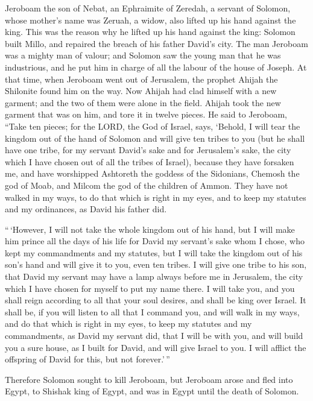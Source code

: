  Jeroboam the son of Nebat, an Ephraimite of Zeredah, a
servant of Solomon, whose mother's name was Zeruah, a widow, also lifted
up his hand against the king.  This was the reason why he
lifted up his hand against the king: Solomon built Millo, and repaired
the breach of his father David's city.  The man Jeroboam
was a mighty man of valour; and Solomon saw the young man that he was
industrious, and he put him in charge of all the labour of the house of
Joseph.  At that time, when Jeroboam went out of Jerusalem,
the prophet Ahijah the Shilonite found him on the way. Now Ahijah had
clad himself with a new garment; and the two of them were alone in the
field.  Ahijah took the new garment that was on him, and
tore it in twelve pieces.  He said to Jeroboam, ``Take ten
pieces; for the LORD, the God of Israel, says, `Behold, I will tear the
kingdom out of the hand of Solomon and will give ten tribes to you
 (but he shall have one tribe, for my servant David's sake
and for Jerusalem's sake, the city which I have chosen out of all the
tribes of Israel),  because they have forsaken me, and have
worshipped Ashtoreth the goddess of the Sidonians, Chemosh the god of
Moab, and Milcom the god of the children of Ammon. They have not walked
in my ways, to do that which is right in my eyes, and to keep my
statutes and my ordinances, as David his father did.

 ``\,`However, I will not take the whole kingdom out of his
hand, but I will make him prince all the days of his life for David my
servant's sake whom I chose, who kept my commandments and my statutes,
 but I will take the kingdom out of his son's hand and will
give it to you, even ten tribes.  I will give one tribe to
his son, that David my servant may have a lamp always before me in
Jerusalem, the city which I have chosen for myself to put my name there.
 I will take you, and you shall reign according to all that
your soul desires, and shall be king over Israel.  It shall
be, if you will listen to all that I command you, and will walk in my
ways, and do that which is right in my eyes, to keep my statutes and my
commandments, as David my servant did, that I will be with you, and will
build you a sure house, as I built for David, and will give Israel to
you.  I will afflict the offspring of David for this, but
not forever.'\,''

 Therefore Solomon sought to kill Jeroboam, but Jeroboam
arose and fled into Egypt, to Shishak king of Egypt, and was in Egypt
until the death of Solomon.

